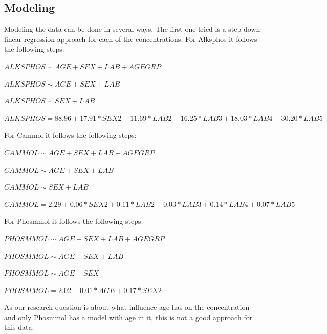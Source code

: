 \documentclass{article}
\begin{document}
    \subsection{Modeling}
      Modeling the data can be done in several ways.
      The first one tried is a step down linear regression approach for each of the concentrations.
      For Alksphos it follows the following steps:
      \begin{itemize}
        \scriptsize{\item $ALKSPHOS \sim AGE + SEX + LAB + AGEGRP$}
        \scriptsize{\item $ALKSPHOS \sim AGE + SEX + LAB$}
        \scriptsize{\item $ALKSPHOS \sim SEX + LAB$}
        \scriptsize{\item $ALKSPHOS = 88.96 + 17.91*SEX2 - 11.69*LAB2 - 16.25*LAB3 + 18.03*LAB4 - 30.20*LAB5$}
      \end{itemize}
      For Cammol it follows the following steps:
      \begin{itemize}
        \scriptsize{\item $CAMMOL \sim AGE + SEX + LAB + AGEGRP$}
        \scriptsize{\item $CAMMOL \sim AGE + SEX + LAB$}
        \scriptsize{\item $CAMMOL \sim SEX + LAB$}
        \scriptsize{\item $CAMMOL = 2.29 + 0.06*SEX2 + 0.11*LAB2 + 0.03*LAB3 + 0.14*LAB4 + 0.07*LAB5$}
      \end{itemize}
      For Phosmmol it follows the following steps:
      \begin{itemize}
        \scriptsize{\item $PHOSMMOL \sim AGE + SEX + LAB + AGEGRP$}
        \scriptsize{\item $PHOSMMOL \sim AGE + SEX + LAB$}
        \scriptsize{\item $PHOSMMOL \sim AGE + SEX$}
        \scriptsize{\item $PHOSMMOL = 2.02 - 0.01*AGE + 0.17*SEX2$}
      \end{itemize}
      As our research question is about what influence age has on the concentration and only Phosmmol has a model with age in it, this is not a good approach for this data.
\end{document}
